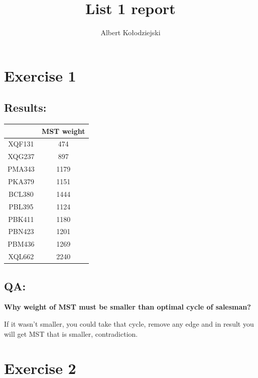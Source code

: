 \documentclass{article}
\title{List 1 report}
\author{Albert Kołodziejski}
\begin{document}
\maketitle
\section*{Exercise 1}
\subsection*{Results:}
\begin{center}
    \begin{tabular}{| c | c |}
        \hline
        & MST weight\\ 
        \hline
        XQF131 & 474\\
        \hline
        XQG237 & 897\\
        \hline
        PMA343 & 1179\\
        \hline
        PKA379 & 1151\\
        \hline
        BCL380 & 1444\\
        \hline
        PBL395 & 1124\\
        \hline
        PBK411 & 1180\\
        \hline
        PBN423 & 1201\\
        \hline
        PBM436 & 1269\\
        \hline
        XQL662 & 2240\\
        \hline
    \end{tabular}
    \end{center}
\subsection*{QA:}
\begin{center}
    \textbf{Why weight of MST must be smaller than optimal cycle of salesman?}
\end{center}
If it wasn't smaller, you could take that cycle, remove any edge and in result you will get MST that is smaller, contradiction.

\section*{Exercise 2}
\end{document}
